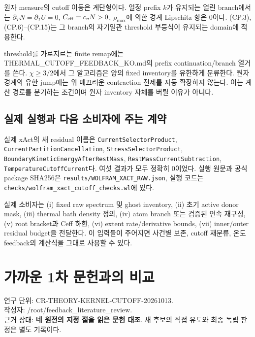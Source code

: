 원자 measure의 cutoff 이동은 계단형이다. 일정 prefix \(k\)가 유지되는 열린 branch에서는 \(\partial_TN=\partial_TU=0\), \(C_{\rm eff}=c_vN>0\), \(\rho_{\max}\)에 의한 경계 Lipschitz 항은 0이다. (CP.3), (CP.6)--(CP.15)는 그 branch의 자기일관 threshold 부등식이 유지되는 domain에 적용한다.

threshold를 가로지르는 finite remap에는 THERMAL\_CUTOFF\_FEEDBACK\_KO.md의 prefix continuation/branch 열거를 쓴다. \(\chi\ge3/2\)에서 그 알고리즘은 양의 fixed inventory를 유한하게 분류한다. 원자 경계의 유한 jump에는 위 매끄러운 contraction 전제를 자동 확장하지 않는다. 이는 계산 경로를 분기하는 조건이며 원자 inventory 자체를 버릴 이유가 아니다.

\hypertarget{uxc2e4uxc81c-uxc2e4uxd589uxacfc-uxb2e4uxc74c-uxc18cuxbe44uxc790uxc5d0-uxc8fcuxb294-uxacc4uxc57d}{%
\subsection{실제 실행과 다음 소비자에 주는 계약}\label{uxc2e4uxc81c-uxc2e4uxd589uxacfc-uxb2e4uxc74c-uxc18cuxbe44uxc790uxc5d0-uxc8fcuxb294-uxacc4uxc57d}}

실제 xAct의 새 residual 이름은 \texttt{CurrentSelectorProduct}, \nolinkurl{CurrentPartitionCancellation}, \texttt{StressSelectorProduct}, \nolinkurl{BoundaryKineticEnergyAfterRestMass}, \texttt{RestMassCurrentSubtraction}, \texttt{TemperatureCutoffCurrent}다. 여섯 결과가 모두 정확히 0이었다. 실행 원문과 공식 package SHA256은 \texttt{results/WOLFRAM\_XACT\_RAW.json}, 실행 코드는 \nolinkurl{checks/wolfram_xact_cutoff_checks.wl}에 있다.

실제 소비자는 (i) fixed raw spectrum 및 ghost inventory, (ii) 초기 active donor mask, (iii) thermal bath density 정의, (iv) atom branch 또는 검증된 연속 재구성, (v) root bracket과 Ceff 하한, (vi) extent rate/derivative bounds, (vii) inner/outer residual budget을 전달한다. 이 입력들이 주어지면 사건별 보존, cutoff 재분류, 온도 feedback의 계산식을 그대로 사용할 수 있다.

\clearpage

\hypertarget{uxac00uxae4cuxc6b4-1uxcc28-uxbb38uxd5ccuxacfcuxc758-uxbe44uxad50}{%
\section{가까운 1차 문헌과의 비교}\label{uxac00uxae4cuxc6b4-1uxcc28-uxbb38uxd5ccuxacfcuxc758-uxbe44uxad50}}

\begingroup
\small

연구 단위: CR-THEORY-KERNEL-CUTOFF-20261013.\\
작성자: /root/feedback\_literature\_review.\\
근거 상태: \textbf{네 원전의 지정 절을 읽은 문헌 대조}. 새 후보의 직접 유도와 최종 독립 판정은 별도 기록이다.

